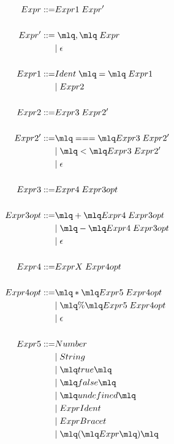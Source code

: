 \documentclass[11pt, a4paper]{article}
\begin{document}
\begin{align*}
Expr        ::=& Expr1 \; Expr'\\
\\
Expr'       ::=& \; \mlq,\mlq \; Expr \\
&| \; \epsilon\\
\\
Expr1       ::=& Ident \; \mlq=\mlq\;  Expr1 \\
&| \; Expr2\\
\\
Expr2       ::=& Expr3 \; Expr2'\\
\\
Expr2'      ::=& \mlq===\mlq Expr3 \; Expr2' \\
&| \; \mlq<\mlq Expr3 \; Expr2'\\
&| \; \epsilon\\
\\
Expr3       ::=& Expr4 \; Expr3opt\\
\\
Expr3opt    ::=& \mlq+\mlq Expr4 \; Expr3opt \\
&| \; \mlq-\mlq Expr4 \; Expr3opt\\
&| \; \epsilon\\
\\
Expr4       ::=& ExprX \; Expr4opt\\
\\
Expr4opt    ::=& \mlq*\mlq Expr5 \; Expr4opt \\
&| \; \mlq \% \mlq Expr5 \; Expr4opt \\
&| \; \epsilon\\
\\
Expr5       ::=& Number\\
&| \; String\\
&| \; \mlq true \mlq\\
&| \; \mlq false \mlq\\
&| \; \mlq undefined \mlq\\
&| \; ExprIdent\\
&| \; ExprBracet\\
&| \; \mlq(\mlq Expr \mlq)\mlq\\
\end{align*}
\end{document}
